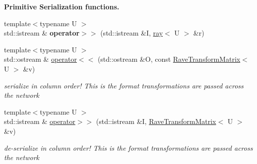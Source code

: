 \begin{Indent}{\bf Primitive Serialization functions.}
\begin{DoxyCompactItemize}
\item 
\hypertarget{namespaceOpenRAVE_1_1geometry_aaf84acd33cf41c2c199720aa2ecaf317}{
{\footnotesize template$<$typename U $>$ }\\std::istream \& {\bfseries operator$>$$>$} (std::istream \&I, \hyperlink{classOpenRAVE_1_1geometry_1_1ray}{ray}$<$ U $>$ \&r)}
\label{namespaceOpenRAVE_1_1geometry_aaf84acd33cf41c2c199720aa2ecaf317}

\item 
\hypertarget{namespaceOpenRAVE_1_1geometry_ad671f7a65724072dcc220442b480b0a2}{
{\footnotesize template$<$typename U $>$ }\\std::ostream \& \hyperlink{namespaceOpenRAVE_1_1geometry_ad671f7a65724072dcc220442b480b0a2}{operator$<$$<$} (std::ostream \&O, const \hyperlink{classOpenRAVE_1_1geometry_1_1RaveTransformMatrix}{RaveTransformMatrix}$<$ U $>$ \&v)}
\label{namespaceOpenRAVE_1_1geometry_ad671f7a65724072dcc220442b480b0a2}

\begin{DoxyCompactList}\small\item\em serialize in column order! This is the format transformations are passed across the network \item\end{DoxyCompactList}\item 
\hypertarget{namespaceOpenRAVE_1_1geometry_a0b70ec7b3559a0cacd66d2b3f98a11d6}{
{\footnotesize template$<$typename U $>$ }\\std::istream \& \hyperlink{namespaceOpenRAVE_1_1geometry_a0b70ec7b3559a0cacd66d2b3f98a11d6}{operator$>$$>$} (std::istream \&I, \hyperlink{classOpenRAVE_1_1geometry_1_1RaveTransformMatrix}{RaveTransformMatrix}$<$ U $>$ \&v)}
\label{namespaceOpenRAVE_1_1geometry_a0b70ec7b3559a0cacd66d2b3f98a11d6}

\begin{DoxyCompactList}\small\item\em de-\/serialize in column order! This is the format transformations are passed across the network \item\end{DoxyCompactList}\end{DoxyCompactItemize}
\end{Indent}

